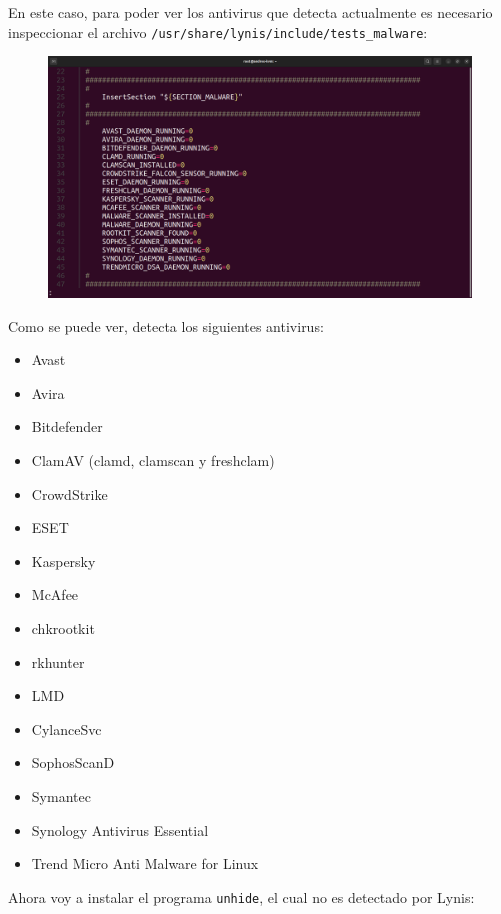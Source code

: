 \documentclass{article}
\begin{document}
En este caso, para poder ver los antivirus que detecta actualmente es necesario inspeccionar el archivo \verb|/usr/share/lynis/include/tests_malware|:

\begin{figure}[H]
    \includegraphics[width=\textwidth]{imagenes/antivirus1.png}
\end{figure}

\newpage

Como se puede ver, detecta los siguientes antivirus: 

\begin{itemize}
    \item Avast
    \item Avira
    \item Bitdefender
    \item ClamAV (clamd, clamscan y freshclam)
    \item CrowdStrike
    \item ESET
    \item Kaspersky
    \item McAfee
    \item chkrootkit
    \item rkhunter
    \item LMD
    \item CylanceSvc
    \item SophosScanD
    \item Symantec
    \item Synology Antivirus Essential
    \item Trend Micro Anti Malware for Linux
\end{itemize}

\bigskip

Ahora voy a instalar el programa \verb|unhide|, el cual no es detectado por Lynis:
\end{document}
